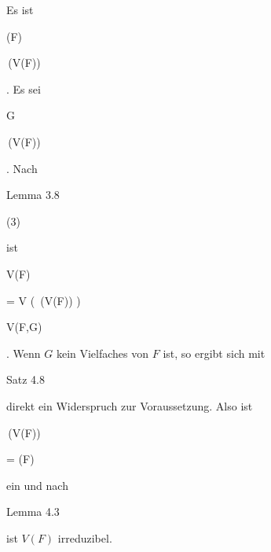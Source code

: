 {


Es ist


\mavergleichskette


{\vergleichskette


{ (F)
}


{ \subseteq }{  \,(V(F))
}


{  }{
}


{    }{
}


{   }{
}


}
{}{}{.}
Es sei


\mavergleichskette


{\vergleichskette


{ G
}


{ \in }{  \,(V(F))
}


{  }{
}


{    }{
}


{   }{
}


}
{}{}{.}
Nach

Lemma 3.8

 (3)

ist


\mavergleichskettedisp


{\vergleichskette


{ V(F)
}


{ =} { V ( \,(V(F)) )
}


{ \subseteq} { V(F,G)
}


{ } {
}


{ } {
}


}
{}{}{.}
Wenn $G$ kein Vielfaches von $F$ ist, so ergibt sich mit

Satz 4.8

direkt ein Widerspruch zur Voraussetzung. Also ist


\mavergleichskettedisp


{\vergleichskette


{  \,(V(F))
}


{ =} {(F)
}


{ } {
}


{ } {
}


{ } {
}


}
{}{}{}
ein
und nach

Lemma 4.3

ist $V(F)$ irreduzibel.


}
